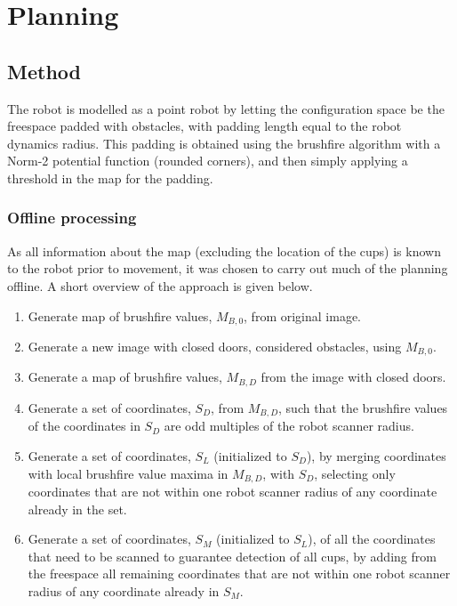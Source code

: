 \section{Planning}
\label{sec:planning}
\subsection{Method}

The robot is modelled as a point robot by letting the configuration space be the freespace padded with obstacles,
with padding length equal to the robot dynamics radius.
This padding is obtained using the brushfire algorithm with a Norm-2 potential function (rounded corners),
and then simply applying a threshold in the map for the padding.


\subsubsection{Offline processing}

As all information about the map (excluding the location of the cups) is known to the robot prior to movement,
it was chosen to carry out much of the planning offline.
A short overview of the approach is given below. 

\begin{enumerate}
\item Generate map of brushfire values, \(M_{B,0}\), from original image.
\item Generate a new image with closed doors, considered obstacles, using \(M_{B,0}\).
\item Generate a map of brushfire values, \(M_{B,D}\) from the image with closed doors.
\item Generate a set of coordinates, \(S_{D}\), from \(M_{B,D}\),
such that the brushfire values of the coordinates in \(S_{D}\) are odd multiples of the robot scanner radius.
\item Generate a set of coordinates, \(S_{L}\) (initialized to \(S_{D}\)), by merging coordinates with local brushfire value maxima
in \(M_{B,D}\), with \(S_{D}\), selecting only coordinates that are not within one robot scanner radius
of any coordinate already in the set.
\item Generate a set of coordinates, \(S_{M}\) (initialized to \(S_{L}\)), of all the coordinates that need to be scanned
to guarantee detection of all cups, by adding from the freespace all remaining coordinates
that are not within one robot scanner radius of any coordinate already in \(S_{M}\).
\end{enumerate}


